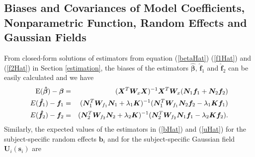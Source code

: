 \documentclass[article,lineno]{biometrika}
\begin{document}
\subsection{Biases and Covariances of Model Coefficients, Nonparametric Function, Random Effects and Gaussian Fields} \label{biasCov}


From closed-form solutions of estimators from equation (\ref{betaHat}) (\ref{f1Hat}) and (\ref{f2Hat}) in  Section \ref{estimation}, the biases of the estimators $\boldsymbol {\hat \beta}$, $\boldsymbol {\hat f}_1$ and 
$\boldsymbol {\hat f}_2$ can be easily calculated and we have
\begin{eqnarray}
{\rm E}(\boldsymbol {\hat \beta})  -  \boldsymbol \beta
&=& \label{biasBeta}
 (\boldsymbol X^T  \boldsymbol W_x \boldsymbol X )^{-1} \boldsymbol X^T  \boldsymbol W_x  (\boldsymbol N_1 \boldsymbol f_1
 +
  \boldsymbol N_2 \boldsymbol f_2) \\
E(\boldsymbol {\hat f}_1) - \boldsymbol f_1  
&=& \label{biasF1}
(\boldsymbol N_1^T \boldsymbol W_{f_1}  \boldsymbol N_1 
+ \lambda_1 \boldsymbol K)^{-1}  
  ( \boldsymbol N_1^T \boldsymbol W_{f_1}
  \boldsymbol N_2 \boldsymbol f_2 - \lambda_1    \boldsymbol K \boldsymbol f_1) \\
E(\boldsymbol {\hat f}_2) - \boldsymbol f_2  
&=&  \label{biasF2}
(\boldsymbol N_2^T \boldsymbol W_{f_2}  \boldsymbol N_2 
+ \lambda_2 \boldsymbol K)^{-1}  
 (\boldsymbol N_2^T \boldsymbol W_{f_2} \boldsymbol N_1 \boldsymbol f_1 
  -  \lambda_2    \boldsymbol K \boldsymbol f_2).
\end{eqnarray}
Similarly,  the expected values of the estimators in (\ref{bHat}) and (\ref{uHat}) for the subject-specific random effects $\boldsymbol b_i$ and for the subject-specific Gaussian field $\boldsymbol U_i(\boldsymbol s_i)$
 are 
\end{document}
